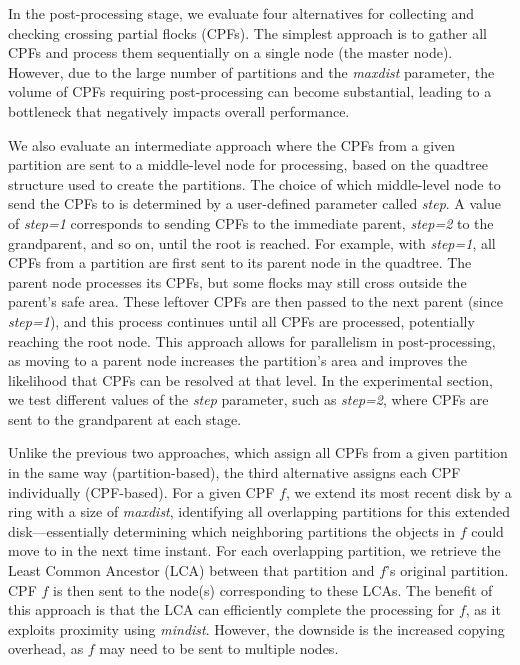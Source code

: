 In the post-processing stage, we evaluate four alternatives for collecting and checking crossing partial flocks (CPFs). The simplest approach is to gather all CPFs and process them sequentially on a single node (the master node). However, due to the large number of partitions and the \textit{maxdist} parameter, the volume of CPFs requiring post-processing can become substantial, leading to a bottleneck that negatively impacts overall performance.

We also evaluate an intermediate approach where the CPFs from a given partition are sent to a middle-level node for processing, based on the quadtree structure used to create the partitions. The choice of which middle-level node to send the CPFs to is determined by a user-defined parameter called \textit{step}. A value of \textit{step=1} corresponds to sending CPFs to the immediate parent, \textit{step=2} to the grandparent, and so on, until the root is reached. For example, with \textit{step=1}, all CPFs from a partition are first sent to its parent node in the quadtree. The parent node processes its CPFs, but some flocks may still cross outside the parent's safe area.  These leftover CPFs are then passed to the next parent (since \textit{step=1}), and this process continues until all CPFs are processed, potentially reaching the root node. This approach allows for parallelism in post-processing, as moving to a parent node increases the partition's area and improves the likelihood that CPFs can be resolved at that level. In the experimental section, we test different values of the \textit{step} parameter, such as \textit{step=2}, where CPFs are sent to the grandparent at each stage.

Unlike the previous two approaches, which assign all CPFs from a given partition in the same way (partition-based), the third alternative assigns each CPF individually (CPF-based). For a given CPF $f$, we extend its most recent disk by a ring with a size of \textit{maxdist}, identifying all overlapping partitions for this extended disk—essentially determining which neighboring partitions the objects in $f$ could move to in the next time instant. For each overlapping partition, we retrieve the Least Common Ancestor (LCA) between that partition and $f$'s original partition. CPF $f$ is then sent to the node(s) corresponding to these LCAs. The benefit of this approach is that the LCA can efficiently complete the processing for $f$, as it exploits proximity using \textit{mindist}. However, the downside is the increased copying overhead, as $f$ may need to be sent to multiple nodes.

